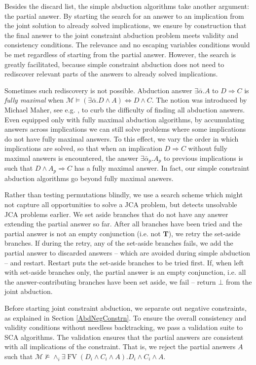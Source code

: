 \documentclass{article}
\newcommand{\tmem}[1]{{\em #1\/}}
\newcommand{\tmmathbf}[1]{\ensuremath{\boldsymbol{#1}}}
\newcommand{\tmop}[1]{\ensuremath{\operatorname{#1}}}
\begin{document}
Besides the discard list, the simple abduction algorithms take another
argument: the partial answer. By starting the search for an answer to an
implication from the joint solution to already solved implications, we ensure
by construction that the final answer to the joint constraint abduction
problem meets validity and consistency conditions. The relevance and no
escaping variables conditions would be met regardless of starting from the
partial answer. However, the search is greatly facilitated, because simple
constraint abduction does not need to rediscover relevant parts of the answers
to already solved implications.

Sometimes such rediscovery is not possible. Abduction answer $\exists
\bar{\alpha} .A$ to $D \Rightarrow C$ is {\tmem{fully maximal}} when
$\mathcal{M} \vDash (\exists \bar{\alpha} .D \wedge A) \Leftrightarrow D
\wedge C$. The notion was introduced by Michael Maher, see e.g.
{\cite{AbductionMaher}}, to curb the difficulty of finding all abduction
answers. Even equipped only with fully maximal abduction algorithms, by
accumulating answers across implications we can still solve problems where
some implications do not have fully maximal answers. To this effect, we vary
the order in which implications are solved, so that when an implication $D
\Rightarrow C$ without fully maximal answers is encountered, the answer
$\exists \bar{\alpha}_p .A_p$ to previous implications is such that $D \wedge
A_p \Rightarrow C$ has a fully maximal answer. In fact, our simple constraint
abduction algorithms go beyond fully maximal answers.

Rather than testing permutations blindly, we use a search scheme which might
not capture all opportunities to solve a JCA problem, but detects unsolvable
JCA problems earlier. We set aside branches that do not have any answer
extending the partial answer so far. After all branches have been tried and
the partial answer is not an empty conjunction (i.e. not $\tmmathbf{T}$), we
retry the set-aside branches. If during the retry, any of the set-aside
branches fails, we add the partial answer to discarded answers -- which are
avoided during simple abduction -- and restart. Restart puts the set-aside
branches to be tried first. If, when left with set-aside branches only, the
partial answer is an empty conjunction, i.e. all the answer-contributing
branches have been set aside, we fail -- return $\bot$ from the joint
abduction.

Before starting joint constraint abduction, we separate out negative
constraints, as explained in Section \ref{AbdNegConstrn}. To ensure the
overall consistency and validity conditions without needless backtracking, we
pass a validation suite to SCA algorithms. The validation ensures that the
partial answers are consistent with all implications of the constraint. That
is, we reject the partial answers $A$ such that $\mathcal{M} \nvDash \wedge_i
\exists \tmop{FV} (D_i \wedge C_i \wedge A) .D_i \wedge C_i \wedge A$.
\end{document}
